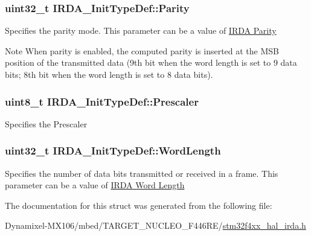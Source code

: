 \subsubsection[{\texorpdfstring{Parity}{Parity}}]{\setlength{\rightskip}{0pt plus 5cm}uint32\+\_\+t I\+R\+D\+A\+\_\+\+Init\+Type\+Def\+::\+Parity}\hypertarget{struct_i_r_d_a___init_type_def_ac8a66f175e3502bba61409c7c08649b0}{}\label{struct_i_r_d_a___init_type_def_ac8a66f175e3502bba61409c7c08649b0}
Specifies the parity mode. This parameter can be a value of \hyperlink{group___i_r_d_a___parity}{I\+R\+DA Parity} \begin{DoxyNote}{Note}
When parity is enabled, the computed parity is inserted at the M\+SB position of the transmitted data (9th bit when the word length is set to 9 data bits; 8th bit when the word length is set to 8 data bits). 
\end{DoxyNote}
\subsubsection[{\texorpdfstring{Prescaler}{Prescaler}}]{\setlength{\rightskip}{0pt plus 5cm}uint8\+\_\+t I\+R\+D\+A\+\_\+\+Init\+Type\+Def\+::\+Prescaler}\hypertarget{struct_i_r_d_a___init_type_def_afb7e30279f08cd39a40ec49e8887fe36}{}\label{struct_i_r_d_a___init_type_def_afb7e30279f08cd39a40ec49e8887fe36}
Specifies the Prescaler 
\subsubsection[{\texorpdfstring{Word\+Length}{WordLength}}]{\setlength{\rightskip}{0pt plus 5cm}uint32\+\_\+t I\+R\+D\+A\+\_\+\+Init\+Type\+Def\+::\+Word\+Length}\hypertarget{struct_i_r_d_a___init_type_def_a0a9bfafe2a9b00be86cd7b75788391ed}{}\label{struct_i_r_d_a___init_type_def_a0a9bfafe2a9b00be86cd7b75788391ed}
Specifies the number of data bits transmitted or received in a frame. This parameter can be a value of \hyperlink{group___i_r_d_a___word___length}{I\+R\+DA Word Length} 

The documentation for this struct was generated from the following file\+:\begin{DoxyCompactItemize}
\item 
Dynamixel-\/\+M\+X106/mbed/\+T\+A\+R\+G\+E\+T\+\_\+\+N\+U\+C\+L\+E\+O\+\_\+\+F446\+R\+E/\hyperlink{stm32f4xx__hal__irda_8h}{stm32f4xx\+\_\+hal\+\_\+irda.\+h}\end{DoxyCompactItemize}
